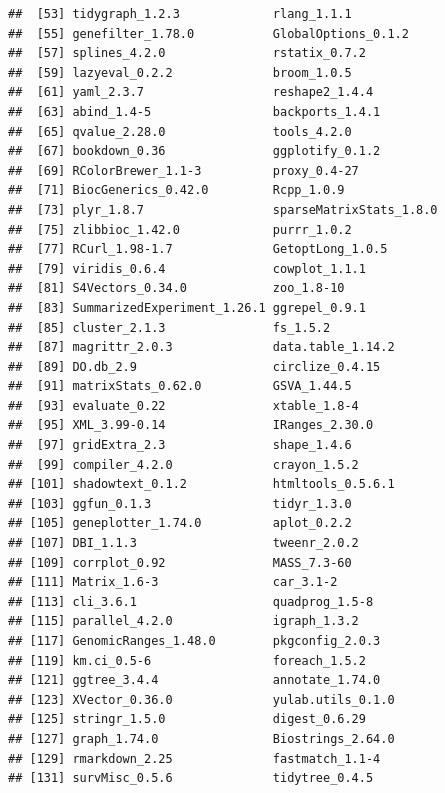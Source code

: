 \documentclass[
  12pt,
]{book}
\begin{document}
\begin{verbatim}
##  [53] tidygraph_1.2.3             rlang_1.1.1                
##  [55] genefilter_1.78.0           GlobalOptions_0.1.2        
##  [57] splines_4.2.0               rstatix_0.7.2              
##  [59] lazyeval_0.2.2              broom_1.0.5                
##  [61] yaml_2.3.7                  reshape2_1.4.4             
##  [63] abind_1.4-5                 backports_1.4.1            
##  [65] qvalue_2.28.0               tools_4.2.0                
##  [67] bookdown_0.36               ggplotify_0.1.2            
##  [69] RColorBrewer_1.1-3          proxy_0.4-27               
##  [71] BiocGenerics_0.42.0         Rcpp_1.0.9                 
##  [73] plyr_1.8.7                  sparseMatrixStats_1.8.0    
##  [75] zlibbioc_1.42.0             purrr_1.0.2                
##  [77] RCurl_1.98-1.7              GetoptLong_1.0.5           
##  [79] viridis_0.6.4               cowplot_1.1.1              
##  [81] S4Vectors_0.34.0            zoo_1.8-10                 
##  [83] SummarizedExperiment_1.26.1 ggrepel_0.9.1              
##  [85] cluster_2.1.3               fs_1.5.2                   
##  [87] magrittr_2.0.3              data.table_1.14.2          
##  [89] DO.db_2.9                   circlize_0.4.15            
##  [91] matrixStats_0.62.0          GSVA_1.44.5                
##  [93] evaluate_0.22               xtable_1.8-4               
##  [95] XML_3.99-0.14               IRanges_2.30.0             
##  [97] gridExtra_2.3               shape_1.4.6                
##  [99] compiler_4.2.0              crayon_1.5.2               
## [101] shadowtext_0.1.2            htmltools_0.5.6.1          
## [103] ggfun_0.1.3                 tidyr_1.3.0                
## [105] geneplotter_1.74.0          aplot_0.2.2                
## [107] DBI_1.1.3                   tweenr_2.0.2               
## [109] corrplot_0.92               MASS_7.3-60                
## [111] Matrix_1.6-3                car_3.1-2                  
## [113] cli_3.6.1                   quadprog_1.5-8             
## [115] parallel_4.2.0              igraph_1.3.2               
## [117] GenomicRanges_1.48.0        pkgconfig_2.0.3            
## [119] km.ci_0.5-6                 foreach_1.5.2              
## [121] ggtree_3.4.4                annotate_1.74.0            
## [123] XVector_0.36.0              yulab.utils_0.1.0          
## [125] stringr_1.5.0               digest_0.6.29              
## [127] graph_1.74.0                Biostrings_2.64.0          
## [129] rmarkdown_2.25              fastmatch_1.1-4            
## [131] survMisc_0.5.6              tidytree_0.4.5             

\end{verbatim}
\end{document}
